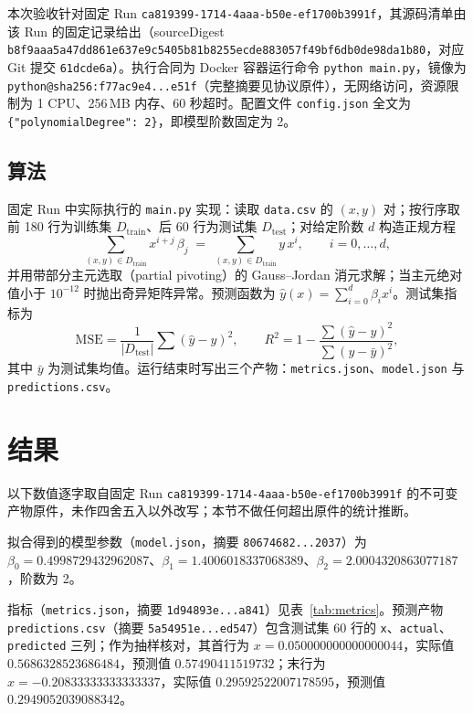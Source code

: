 \documentclass[a4paper,11pt]{article}
\begin{document}
本次验收针对固定 Run \texttt{ca819399-1714-4aaa-b50e-ef1700b3991f}，其源码清单由该 Run 的固定记录给出（sourceDigest \texttt{b8f9aaa5a47dd861e637e9c5405b81b8255ecde883057f49bf6db0de98da1b80}，对应 Git 提交 \texttt{61dcde6a}）。执行合同为 Docker 容器运行命令 \texttt{python main.py}，镜像为 \texttt{python@sha256:f77ac9e4...e51f}（完整摘要见协议原件），无网络访问，资源限制为 1 CPU、256\,MB 内存、60 秒超时。配置文件 \texttt{config.json} 全文为 \texttt{\{"polynomialDegree": 2\}}，即模型阶数固定为 2。

\subsection{算法}

固定 Run 中实际执行的 \texttt{main.py} 实现：读取 \texttt{data.csv} 的 $(x,y)$ 对；按行序取前 180 行为训练集 \(D_{\mathrm{train}}\)、后 60 行为测试集 \(D_{\mathrm{test}}\)；对给定阶数 \(d\) 构造正规方程
\begin{equation}
\sum_{(x,y)\in D_{\mathrm{train}}} x^{i+j}\,\beta_j \;=\; \sum_{(x,y)\in D_{\mathrm{train}}} y\,x^{i}, \qquad i=0,\dots,d,
\label{eq:normal}
\end{equation}
并用带部分主元选取（partial pivoting）的 Gauss--Jordan 消元求解；当主元绝对值小于 $10^{-12}$ 时抛出奇异矩阵异常。预测函数为 $\hat y(x)=\sum_{i=0}^{d}\beta_i x^i$。测试集指标为
\begin{equation}
\mathrm{MSE} = \frac{1}{|D_{\mathrm{test}}|}\sum (\hat y - y)^2, \qquad
R^2 = 1 - \frac{\sum (\hat y - y)^2}{\sum (y - \bar y)^2},
\label{eq:metrics}
\end{equation}
其中 $\bar y$ 为测试集均值。运行结束时写出三个产物：\texttt{metrics.json}、\texttt{model.json} 与 \texttt{predictions.csv}。

\section{结果}

以下数值逐字取自固定 Run \texttt{ca819399-1714-4aaa-b50e-ef1700b3991f} 的不可变产物原件，未作四舍五入以外改写；本节不做任何超出原件的统计推断。

拟合得到的模型参数（\texttt{model.json}，摘要 \texttt{80674682...2037}）为 $\beta_0=0.4998729432962087$、$\beta_1=1.4006018337068389$、$\beta_2=2.0004320863077187$，阶数为 2。

指标（\texttt{metrics.json}，摘要 \texttt{1d94893e...a841}）见表~\ref{tab:metrics}。预测产物 \texttt{predictions.csv}（摘要 \texttt{5a54951e...ed547}）包含测试集 60 行的 \texttt{x}、\texttt{actual}、\texttt{predicted} 三列；作为抽样核对，其首行为 $x=0.050000000000000044$，实际值 $0.5686328523686484$，预测值 $0.57490411519732$；末行为 $x=-0.20833333333333337$，实际值 $0.29592522007178595$，预测值 $0.2949052039088342$。
\end{document}
